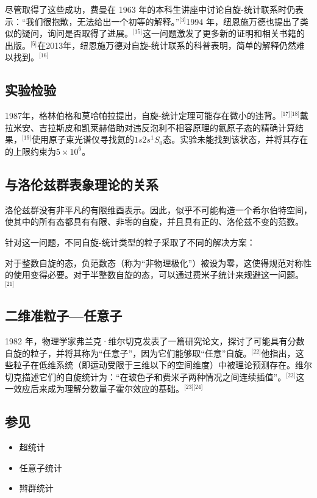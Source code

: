 尽管取得了这些成功，费曼在 1963 年的本科生讲座中讨论自旋-统计联系时仍表示：“我们很抱歉，无法给出一个初等的解释。”\(^\text{[3]}\)1994 年，纽恩施万德也提出了类似的疑问，询问是否取得了进展。\(^\text{[15]}\)这一问题激发了更多新的证明和相关书籍的出版。\(^\text{[5]}\)在2013年，纽恩施万德对自旋-统计联系的科普表明，简单的解释仍然难以找到。\(^\text{[16]}\)
\subsection{实验检验}
1987年，格林伯格和莫哈帕拉提出，自旋-统计定理可能存在微小的违背。\(^\text{[17][18]}\)戴拉米安、吉拉斯皮和凯莱赫借助对违反泡利不相容原理的氦原子态的精确计算结果，\(^\text{[19]}\)使用原子束光谱仪寻找氦的\(1s2s^1S_0\)态。实验未能找到该状态，并将其存在的上限约束为\(5\times10^{6}\)。
\subsection{与洛伦兹群表象理论的关系}  
洛伦兹群没有非平凡的有限维酉表示。因此，似乎不可能构造一个希尔伯特空间，使其中的所有态都具有有限、非零的自旋，并且具有正的、洛伦兹不变的范数。  

针对这一问题，不同自旋-统计类型的粒子采取了不同的解决方案：  

对于整数自旋的态，负范数态（称为“非物理极化”）被设为零，这使得规范对称性的使用变得必要。对于半整数自旋的态，可以通过费米子统计来规避这一问题。\(^\text{[21]}\)
\subsection{二维准粒子—任意子} 
1982 年，物理学家弗兰克·维尔切克发表了一篇研究论文，探讨了可能具有分数自旋的粒子，并将其称为“任意子”，因为它们能够取“任意”自旋。\(^\text{[22]}\)他指出，这些粒子在低维系统（即运动受限于三维以下的空间维度）中被理论预测存在。维尔切克描述它们的自旋统计为：“在玻色子和费米子两种情况之间连续插值”。\(^\text{[22]}\)这一效应后来成为理解分数量子霍尔效应的基础。\(^\text{[23][24]}\)
\subsection{参见 }
\begin{itemize}
\item 超统计
\item 任意子统计 
\item 辫群统计
\end{itemize}